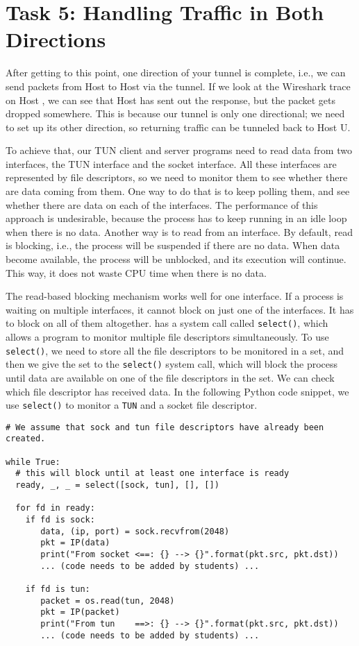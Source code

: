 \section{Task 5: Handling Traffic in Both Directions}


After getting to this point, one direction of your tunnel is complete, i.e.,
we can send packets from Host \hostu to Host \hostv via the tunnel. If we look at the
Wireshark trace on Host \hostv, we can see that Host \hostv has sent out the 
response, but the packet gets dropped somewhere. This is because 
our tunnel is only one directional; we need to set up its other direction, so returning
traffic can be tunneled back to Host U.


To achieve that, our TUN client and server programs need to read data from two interfaces, 
the TUN interface and the socket interface.  
All these interfaces are represented by file descriptors, so we need to
monitor them to see whether there are data coming from them.
One way to do that is to keep polling them, and
see whether there are data on each of the interfaces. The performance of this approach is
undesirable, because the process has to keep running in an idle loop when there is no data.
Another way is to read from an interface.  By default, read is blocking, i.e., the process will
be suspended if there are no data. When data become available, the process will be unblocked,
and its execution will continue. This way, it does not waste CPU time when there is no data.

The read-based blocking mechanism works well for one interface. If a process is waiting on
multiple interfaces, it cannot block on just one of the interfaces. It has to block on all of
them altogether.  \linux has a system call called \texttt{select()}, which
allows a program to monitor multiple file descriptors simultaneously.
To use \texttt{select()}, we need to store all the file descriptors to be monitored in a set,
and then we give the set to the \texttt{select()} system
call, which will block the process until data are available on one of the
file descriptors in the set. We can check which
file descriptor has received data. In the following Python code snippet,
we use \texttt{select()} to monitor a \texttt{TUN} and a socket file
descriptor.


\begin{lstlisting}
# We assume that sock and tun file descriptors have already been created.

while True:
  # this will block until at least one interface is ready
  ready, _, _ = select([sock, tun], [], [])

  for fd in ready:
    if fd is sock:
       data, (ip, port) = sock.recvfrom(2048)
       pkt = IP(data)
       print("From socket <==: {} --> {}".format(pkt.src, pkt.dst))
       ... (code needs to be added by students) ...

    if fd is tun:
       packet = os.read(tun, 2048)
       pkt = IP(packet)
       print("From tun    ==>: {} --> {}".format(pkt.src, pkt.dst))
       ... (code needs to be added by students) ...
\end{lstlisting}
 

